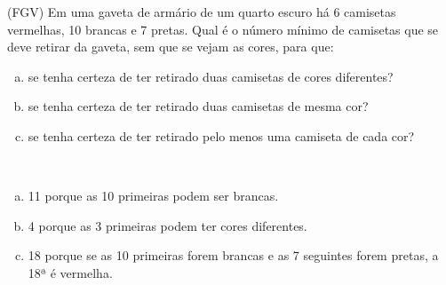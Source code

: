 \begin{ex}
 (FGV) Em uma gaveta de armário de um quarto escuro há 6 camisetas vermelhas, 10 brancas e 7 pretas. Qual é o número mínimo de camisetas que se deve retirar da gaveta, sem que se vejam as cores, para que:
    \begin{enumerate}[(a)]
    \item se tenha certeza de ter retirado duas camisetas de cores diferentes?
    \item se tenha certeza de ter retirado duas camisetas de mesma cor?
    \item se tenha certeza de ter retirado pelo menos uma camiseta de cada cor?
    \end{enumerate} 
     \begin{sol}
        \phantom{A}  \\
        \begin{enumerate} [(a)]
            \item 11 porque as 10 primeiras podem ser brancas.
            \item 4 porque as 3 primeiras podem ter cores diferentes.
            \item 18 porque se as 10 primeiras forem brancas e as 7 seguintes forem pretas, a 18ª é vermelha.
        \end{enumerate}
     \end{sol}
\end{ex}